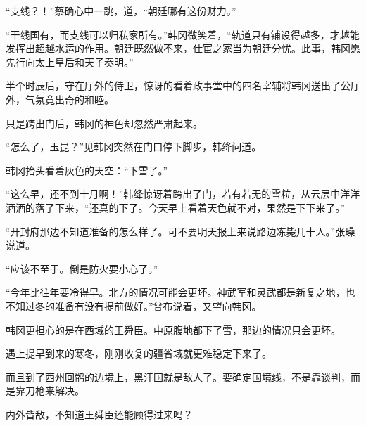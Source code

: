 “支线？！”蔡确心中一跳，道，“朝廷哪有这份财力。”

“干线国有，而支线可以归私家所有。”韩冈微笑着，“轨道只有铺设得越多，才越能发挥出超越水运的作用。朝廷既然做不来，仕宦之家当为朝廷分忧。此事，韩冈愿先行向太上皇后和天子奏明。”

半个时辰后，守在厅外的侍卫，惊讶的看着政事堂中的四名宰辅将韩冈送出了公厅外，气氛竟出奇的和睦。

只是跨出门后，韩冈的神色却忽然严肃起来。

“怎么了，玉昆？”见韩冈突然在门口停下脚步，韩绛问道。

韩冈抬头看着灰色的天空：“下雪了。”

“这么早，还不到十月啊！”韩绛惊讶着跨出了门，若有若无的雪粒，从云层中洋洋洒洒的落了下来，“还真的下了。今天早上看着天色就不对，果然是下下来了。”

“开封府那边不知道准备的怎么样了。可不要明天报上来说路边冻毙几十人。”张璪说道。

“应该不至于。倒是防火要小心了。”

“今年比往年要冷得早。北方的情况可能会更坏。神武军和灵武都是新复之地，也不知过冬的准备有没有提前做好。”曾布说着，又望向韩冈。

韩冈更担心的是在西域的王舜臣。中原腹地都下了雪，那边的情况只会更坏。

遇上提早到来的寒冬，刚刚收复的疆省域就更难稳定下来了。

而且到了西州回鹘的边境上，黑汗国就是敌人了。要确定国境线，不是靠谈判，而是靠刀枪来解决。

内外皆敌，不知道王舜臣还能顾得过来吗？
